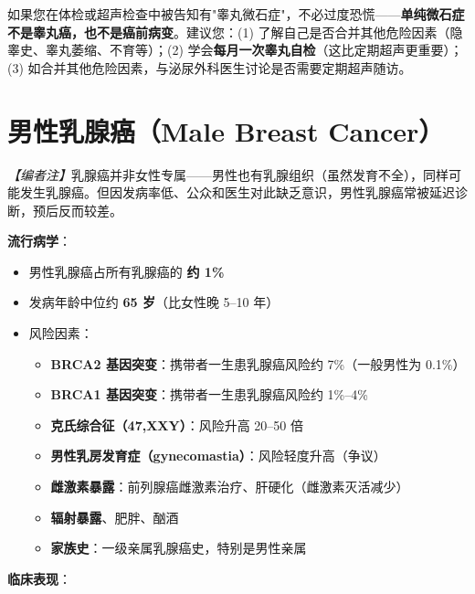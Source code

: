 \begin{tcolorbox}[colback=pink!5!white,colframe=red!50!black,title=贴心小叮咛]
如果您在体检或超声检查中被告知有"睾丸微石症"，不必过度恐慌——\textbf{单纯微石症不是睾丸癌，也不是癌前病变}。建议您：(1) 了解自己是否合并其他危险因素（隐睾史、睾丸萎缩、不育等）；(2) 学会\textbf{每月一次睾丸自检}（这比定期超声更重要）；(3) 如合并其他危险因素，与泌尿外科医生讨论是否需要定期超声随访。
\end{tcolorbox}

\section{男性乳腺癌（Male Breast Cancer）}
\label{sec:male_breast_cancer}

\noindent\textit{【编者注】}乳腺癌并非女性专属——男性也有乳腺组织（虽然发育不全），同样可能发生乳腺癌。但因发病率低、公众和医生对此缺乏意识，男性乳腺癌常被延迟诊断，预后反而较差。

\vspace{0.5em}
\noindent\textbf{流行病学}：

\begin{itemize}[leftmargin=2cm]
	\item 男性乳腺癌占所有乳腺癌的 \textbf{约 1\%}
	\item 发病年龄中位约 \textbf{65 岁}（比女性晚 5--10 年）
	\item 风险因素：
	\begin{itemize}
		\item \textbf{BRCA2 基因突变}：携带者一生患乳腺癌风险约 7\%（一般男性为 0.1\%）
		\item \textbf{BRCA1 基因突变}：携带者一生患乳腺癌风险约 1\%--4\%
		\item \textbf{克氏综合征（47,XXY）}：风险升高 20--50 倍
		\item \textbf{男性乳房发育症（gynecomastia）}：风险轻度升高（争议）
		\item \textbf{雌激素暴露}：前列腺癌雌激素治疗、肝硬化（雌激素灭活减少）
		\item \textbf{辐射暴露}、肥胖、酗酒
		\item \textbf{家族史}：一级亲属乳腺癌史，特别是男性亲属
	\end{itemize}
\end{itemize}

\vspace{0.5em}
\noindent\textbf{临床表现}：

